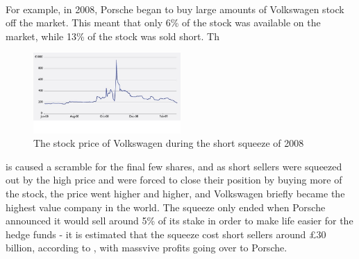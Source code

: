 \documentclass[11pt]{article} %
\begin{document}
\paragraph{}
For example, 
in 2008, Porsche began to buy large amounts of Volkswagen stock off the market. This 
meant that only 6\% of the stock was available on the market, while 13\% of the stock 
was sold short. Th\begin{figure}[h]
    \centering
    \includegraphics[width=0.5\textwidth]{volkswagen.jpg}
    \caption{The stock price of Volkswagen during the short squeeze of 2008}
    \end{figure}is caused a scramble for the final few shares, and as short sellers 
were squeezed out by the high price and were forced to close their position by buying 
more of the stock, the price went higher and higher, and Volkswagen briefly became 
the highest value company in the world. The squeeze only ended when Porsche announced 
it would sell around 5\% of its stake in order to make life easier for the hedge 
funds - it is estimated that the squeeze cost short sellers around £30 billion, 
according to \cite{volkswagen}, with massvive profits going over to Porsche.
\end{document}
